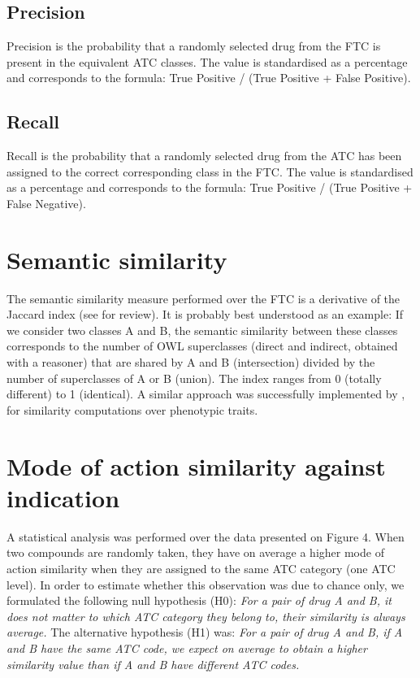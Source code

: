 \documentclass{bioinfo}
\begin{document}
\subsection{Precision}
Precision is the probability that a randomly selected drug from the FTC is present in the equivalent ATC classes. 
The value is standardised as a percentage and corresponds to the formula: True Positive / (True Positive + False Positive).

\subsection{Recall}
Recall is the probability that a randomly selected drug from the ATC has been assigned to the correct 
corresponding class in the FTC. The value is standardised as a percentage and corresponds 
to the formula: True Positive / (True Positive + False Negative).

\section{Semantic similarity}
The semantic similarity measure performed over the FTC is a derivative of the 
Jaccard index \citep{jaccard1912distribution} \citep{rogers1960computer} (see \cite{pesquita2009semantic} for review). 
It is probably best understood as an example: If we consider two classes A and B, the semantic similarity 
between these classes corresponds to the number of OWL superclasses (direct and indirect, obtained with a reasoner) that 
are shared by A and B (intersection) divided by the number of superclasses of A or B (union). The index ranges 
from 0 (totally different) to 1 (identical). A similar approach was successfully implemented by \citep{hoehndorf2011phenomenet}, for similarity computations over phenotypic traits. 

\section{Mode of action similarity against indication}
A statistical analysis was performed over the data presented on Figure 4. 
When two compounds are randomly taken, they have on average a higher mode of action similarity when 
they are assigned to the same ATC category (one ATC level).
In order to estimate whether this observation was 
due to chance only, we formulated the following null hypothesis (H0): \emph{For a pair of drug A and B, it does not 
matter to which ATC category they belong to, their similarity is always average.}
The alternative hypothesis (H1) was: \emph{For a pair of drug A and B, if A and B have the same ATC code, 
we expect on average to obtain a higher similarity value than if A and B have different ATC codes.}
\end{document}
